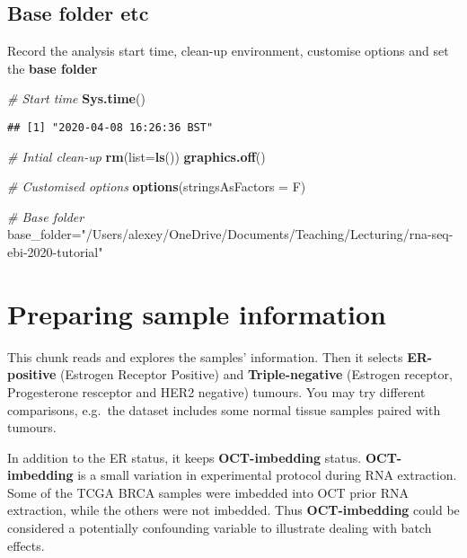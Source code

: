 \documentclass[]{book}
\newenvironment{Shaded}{\begin{snugshade}}{\end{snugshade}}
\newcommand{\KeywordTok}[1]{\textcolor[rgb]{0.13,0.29,0.53}{\textbf{#1}}}
\newcommand{\DataTypeTok}[1]{\textcolor[rgb]{0.13,0.29,0.53}{#1}}
\newcommand{\StringTok}[1]{\textcolor[rgb]{0.31,0.60,0.02}{#1}}
\newcommand{\CommentTok}[1]{\textcolor[rgb]{0.56,0.35,0.01}{\textit{#1}}}
\newcommand{\NormalTok}[1]{#1}
\begin{document}
\section{Base folder etc}\label{base-folder-etc}

Record the analysis start time, clean-up environment, customise options
and set the \textbf{base folder}

\begin{Shaded}
\begin{Highlighting}[]
\CommentTok{# Start time}
\KeywordTok{Sys.time}\NormalTok{()}
\end{Highlighting}
\end{Shaded}

\begin{verbatim}
## [1] "2020-04-08 16:26:36 BST"
\end{verbatim}

\begin{Shaded}
\begin{Highlighting}[]
\CommentTok{# Intial clean-up}
\KeywordTok{rm}\NormalTok{(}\DataTypeTok{list=}\KeywordTok{ls}\NormalTok{())}
\KeywordTok{graphics.off}\NormalTok{()}

\CommentTok{# Customised options}
\KeywordTok{options}\NormalTok{(}\DataTypeTok{stringsAsFactors =}\NormalTok{ F)}

\CommentTok{# Base folder}
\NormalTok{base_folder=}\StringTok{"/Users/alexey/OneDrive/Documents/Teaching/Lecturing/rna-seq-ebi-2020-tutorial"}
\end{Highlighting}
\end{Shaded}

\chapter{Preparing sample
information}\label{preparing-sample-information}

This chunk reads and explores the samples' information. Then it selects
\textbf{ER-positive} (Estrogen Receptor Positive) and
\textbf{Triple-negative} (Estrogen receptor, Progesterone resceptor and
HER2 negative) tumours. You may try different comparisons, e.g.~the
dataset includes some normal tissue samples paired with tumours.

In addition to the ER status, it keeps \textbf{OCT-imbedding} status.
\textbf{OCT-imbedding} is a small variation in experimental protocol
during RNA extraction. Some of the TCGA BRCA samples were imbedded into
OCT prior RNA extraction, while the others were not imbedded. Thus
\textbf{OCT-imbedding} could be considered a potentially confounding
variable to illustrate dealing with batch effects.
\end{document}
